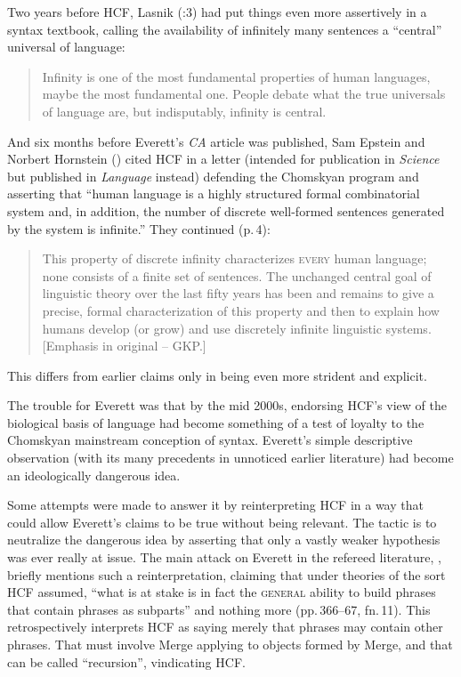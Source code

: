 \documentclass[output=paper,colorlinks,citecolor=brown
]{langscibook}
\begin{document}
Two years before HCF, Lasnik (\citeyear{Lasnik00}:3) had put things
even more assertively in a syntax textbook, calling the availability
of infinitely many sentences a ``central'' universal of language:
\begin{quote}
Infinity is one of the most fundamental properties of human languages,
maybe the most fundamental one. People debate what the true universals
of language are, but indisputably, infinity is central.
\end{quote}
And six months before Everett's \textit{CA} article was published,
Sam Epstein and Norbert Hornstein (\citeyear{EpstHorn05}) cited HCF in
a letter (intended for publication in \textit{Science} but published
in \textit{Language} instead) defending the Chomskyan program and asserting
that ``human language is a highly structured formal combinatorial system
and, in addition, the number of discrete well-formed sentences generated
by the system is infinite.'' They continued (p.\,4):
\begin{quote}
This property of discrete infinity characterizes \mbox{\textsc{every}}
human language; none consists of a finite set of sentences. The unchanged
central goal of linguistic theory over the last fifty years has been and
remains to give a precise, formal characterization of this property and
then to explain how humans develop (or grow) and use discretely infinite
linguistic systems. [Emphasis in original -- GKP.]
\end{quote}
This differs from earlier claims only in being even more strident and
explicit.

The trouble for Everett was that by the mid 2000s, endorsing HCF's view
of the biological basis of language had become something of a test of
loyalty to the Chomskyan mainstream conception of syntax. Everett's
simple descriptive observation (with its many precedents in unnoticed
earlier literature) had become an ideologically dangerous idea.

Some attempts were made to answer it by reinterpreting HCF in a way
that could allow Everett's claims to be true without being relevant.
The tactic is to neutralize the dangerous idea by asserting that only
a vastly weaker hypothesis was ever really at issue. The main attack
on Everett in the refereed literature, \citet{NevPesRod09a}, briefly
mentions such a reinterpretation, claiming that under theories of the
sort HCF assumed, ``what is at stake is in fact the \textsc{general}
ability to build phrases that contain phrases as subparts'' and nothing
more (pp.\,366--67, fn.\,11). This retrospectively interprets HCF as
saying merely that phrases may contain other phrases. That must involve
Merge applying to objects formed by Merge, and that can be called
``recursion'', vindicating HCF.
\end{document}
